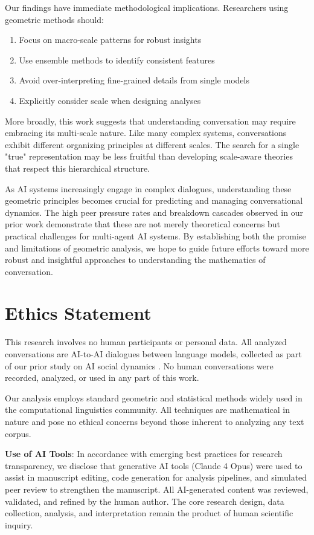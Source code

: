 \documentclass[11pt,letterpaper]{article}
\begin{document}
Our findings have immediate methodological implications. Researchers using geometric methods should:
\begin{enumerate}
\item Focus on macro-scale patterns for robust insights
\item Use ensemble methods to identify consistent features
\item Avoid over-interpreting fine-grained details from single models
\item Explicitly consider scale when designing analyses
\end{enumerate}

More broadly, this work suggests that understanding conversation may require embracing its multi-scale nature. Like many complex systems, conversations exhibit different organizing principles at different scales. The search for a single "true" representation may be less fruitful than developing scale-aware theories that respect this hierarchical structure.

As AI systems increasingly engage in complex dialogues, understanding these geometric principles becomes crucial for predicting and managing conversational dynamics. The high peer pressure rates and breakdown cascades observed in our prior work demonstrate that these are not merely theoretical concerns but practical challenges for multi-agent AI systems. By establishing both the promise and limitations of geometric analysis, we hope to guide future efforts toward more robust and insightful approaches to understanding the mathematics of conversation.

\section{Ethics Statement}

This research involves no human participants or personal data. All analyzed conversations are AI-to-AI dialogues between language models, collected as part of our prior study on AI social dynamics \citep{garcia2025peer}. No human conversations were recorded, analyzed, or used in any part of this work.

Our analysis employs standard geometric and statistical methods widely used in the computational linguistics community. All techniques are mathematical in nature and pose no ethical concerns beyond those inherent to analyzing any text corpus.

\textbf{Use of AI Tools}: In accordance with emerging best practices for research transparency, we disclose that generative AI tools (Claude 4 Opus) were used to assist in manuscript editing, code generation for analysis pipelines, and simulated peer review to strengthen the manuscript. All AI-generated content was reviewed, validated, and refined by the human author. The core research design, data collection, analysis, and interpretation remain the product of human scientific inquiry.
\end{document}
